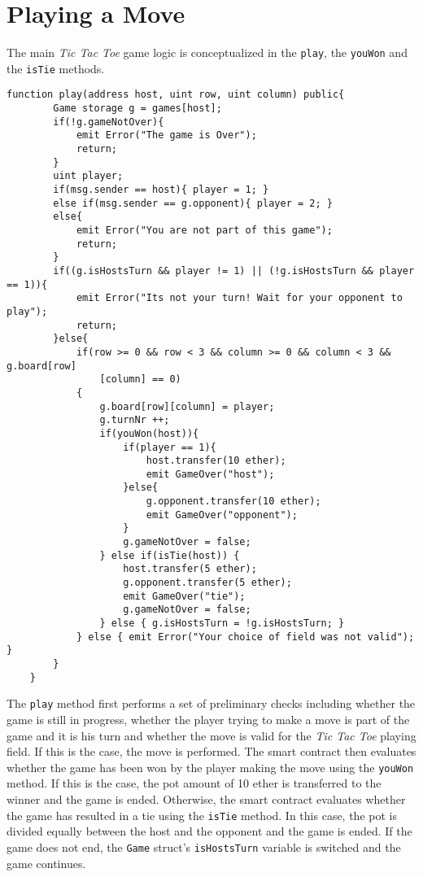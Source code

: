 \documentclass[10pt]{article}
\begin{document}
\section{Playing a Move}
The main \emph{Tic Tac Toe} game logic is conceptualized in the \texttt{play}, the \texttt{youWon} and the \texttt{isTie} methods.
\begin{Verbatim}[fontsize=\small]
function play(address host, uint row, uint column) public{
        Game storage g = games[host];
        if(!g.gameNotOver){
            emit Error("The game is Over");
            return;
        }
        uint player;
        if(msg.sender == host){ player = 1; }
        else if(msg.sender == g.opponent){ player = 2; }
        else{
            emit Error("You are not part of this game");
            return;
        }
        if((g.isHostsTurn && player != 1) || (!g.isHostsTurn && player == 1)){
            emit Error("Its not your turn! Wait for your opponent to play");
            return;
        }else{
            if(row >= 0 && row < 3 && column >= 0 && column < 3 && g.board[row]
            	[column] == 0)
            {
                g.board[row][column] = player;
                g.turnNr ++;
                if(youWon(host)){
                    if(player == 1){
                        host.transfer(10 ether);
                        emit GameOver("host");
                    }else{
                        g.opponent.transfer(10 ether);
                        emit GameOver("opponent");
                    }
                    g.gameNotOver = false;
                } else if(isTie(host)) {
                    host.transfer(5 ether);
                    g.opponent.transfer(5 ether);
                    emit GameOver("tie");
                    g.gameNotOver = false;
                } else { g.isHostsTurn = !g.isHostsTurn; }
            } else { emit Error("Your choice of field was not valid"); }
        }
    }
\end{Verbatim}
The \texttt{play} method first performs a set of preliminary checks including whether the game is still in progress, whether the player trying to make a move is part of the game and it is his turn and whether the move is valid for the \emph{Tic Tac Toe} playing field. If this is the case, the move is performed. The smart contract then evaluates whether the game has been won by the player making the move using the \texttt{youWon} method. If this is the case, the pot amount of 10 ether is transferred to the winner and the game is ended. Otherwise, the smart contract evaluates whether the game has resulted in a tie using the \texttt{isTie} method. In this case, the pot is divided equally between the host and the opponent and the game is ended. If the game does not end, the \texttt{Game} struct's \texttt{isHostsTurn} variable is switched and the game continues.
\end{document}
